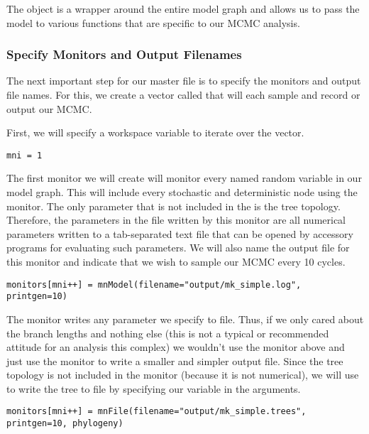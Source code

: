 The object  is a wrapper around the entire model graph and allows us to pass the model to various functions that are specific to our MCMC analysis.

\medskip
\subsubsection{Specify Monitors and Output Filenames}\label{subsub:Exercise-Monitors}

The next important step for our master \Rev file is to specify the monitors and output file names.
For this, we create a vector called  that will each sample and record or output our MCMC. 

First, we will specify a workspace variable to iterate over the  vector.
{\tt \begin{snugshade*}
\begin{lstlisting}
mni = 1
\end{lstlisting}
\end{snugshade*}}

The first monitor we will create will monitor every named random variable in our model graph. 
This will include every stochastic and deterministic node using the  monitor.
The only parameter that is not included in the  is the tree topology. 
Therefore, the parameters in the file written by this monitor are all numerical parameters written to a tab-separated text file that can be opened by accessory programs for evaluating such parameters.
We will also name the output file for this monitor and indicate that we wish to sample our MCMC every 10 cycles.
{\tt \begin{snugshade*}
\begin{lstlisting}
monitors[mni++] = mnModel(filename="output/mk_simple.log", printgen=10)
\end{lstlisting}
\end{snugshade*}}

The  monitor writes any parameter we specify to file.
Thus, if we only cared about the branch lengths and nothing else (this is not a typical or recommended attitude for an analysis this complex) we wouldn't use the  monitor above and just use the  monitor to write a smaller and simpler output file.
Since the tree topology is not included in the  monitor (because it is not numerical), we will use  to write the tree to file by specifying our  variable in the arguments.
{\tt \begin{snugshade*}
\begin{lstlisting}
monitors[mni++] = mnFile(filename="output/mk_simple.trees", printgen=10, phylogeny)
\end{lstlisting}
\end{snugshade*}}

